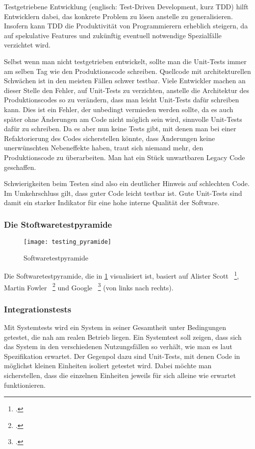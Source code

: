 Testgetriebene Entwicklung (englisch: Test-Driven Development, kurz TDD) hilft Entwicklern
dabei, das konkrete Problem zu lösen anstelle zu generalisieren. Insofern kann TDD
die Produktivität von Programmierern erheblich steigern, da auf spekulative Features und
zukünftig eventuell notwendige Spezialfälle verzichtet wird.

Selbst wenn man nicht testgetrieben entwickelt, sollte man die Unit-Tests immer am selben
Tag wie den Produktionscode schreiben. Quellcode mit architekturellen Schwächen ist in den 
meisten Fällen schwer testbar. Viele Entwickler machen an dieser Stelle den Fehler, auf Unit-Tests
zu verzichten, anstelle die Architektur des Produktionscodes so zu verändern, dass man
leicht Unit-Tests dafür schreiben kann. Dies ist ein Fehler, der unbedingt vermieden werden
sollte, da es auch später ohne Änderungen am Code nicht möglich sein wird, sinnvolle Unit-Tests
dafür zu schreiben. Da es aber nun keine Tests gibt, mit denen man bei einer Refaktorierung
des Codes sicherstellen könnte, dass Änderungen keine unerwünschten Nebeneffekte haben, traut sich niemand mehr,
den Produktionscode zu überarbeiten. Man hat ein Stück unwartbaren Legacy Code geschaffen.

Schwierigkeiten beim Testen sind also ein deutlicher Hinweis auf schlechten Code. Im Umkehrschluss
gilt, dass guter Code leicht testbar ist. Gute Unit-Tests sind damit ein starker Indikator für eine hohe interne Qualität der Software.

\subsubsection{Die Stoftwaretestpyramide}

\begin{figure}[H]
    \begin{center}
        \texttt{[image: testing\_pyramide]}
        \caption{Softwaretestpyramide}
        \label{[softwaretestpyramide]}
    \end{center}
\end{figure}

Die Softwaretestpyramide, die in \ref{[softwaretestpyramide]} visualisiert ist, basiert auf Alister Scott ~\footcite[Vgl.]{website:scott.2011}, Martin Fowler
 ~\footcite[Vgl.]{website:fowler.2012} und Google  ~\footcite[Vgl. Seite 12-14]{Whittaker.2012} (von links nach rechts).


\subsubsection{Integrationstests}
Mit Systemtests wird ein System in seiner Gesamtheit unter Bedingungen getestet, die nah
am realen Betrieb liegen. Ein Systemtest soll zeigen, dass sich das System in den verschiedenen
Nutzungsfällen so verhält, wie man es laut Spezifikation erwartet. Der Gegenpol dazu sind
Unit-Tests, mit denen Code in möglichst kleinen Einheiten isoliert getestet wird. Dabei möchte
man sicherstellen, dass die einzelnen Einheiten jeweils für sich alleine wie erwartet funktionieren.


